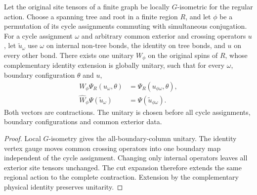\begin{lemma}%
    \label{thm:peps_regular_cycle_global_permutation}
    \leanok
    Let the original site tensors of a finite graph be locally $G$-isometric
    for the regular action. Choose a spanning tree and root in a finite region
    $R$, and let $\phi$ be a permutation of its cycle assignments commuting
    with simultaneous conjugation. For a cycle assignment $\omega$ and arbitrary
    common exterior and crossing operators $u$, let $\widetilde u_\omega$ use
    $\omega$ on internal non-tree bonds, the identity on tree bonds, and $u$
    on every other bond. There exists one unitary $W_\phi$ on the original
    spins of $R$, whose complementary identity extension is globally unitary,
    such that for every $\omega$, boundary configuration $\theta$ and $u$,
    \begin{align}
        W_\phi\Psi_R(u_\omega,\theta)
         & =\Psi_R(u_{\phi\omega},\theta),   \\
        \widehat W_\phi\Psi(\widetilde u_\omega)
         & =\Psi(\widetilde u_{\phi\omega}).
    \end{align}
    Both vectors are contractions. The unitary is chosen before all
    cycle assignments, boundary configurations and common exterior data.
\end{lemma}
\begin{proof}\leanok
    Local $G$-isometry gives the all-boundary-column unitary. The identity
    vertex gauge moves common crossing operators into one boundary map
    independent of the cycle assignment. Changing only internal operators
    leaves all exterior site tensors unchanged. The cut expansion
    therefore extends the same regional action to the complete contraction.
    Extension by the complementary physical identity preserves unitarity.
\end{proof}

